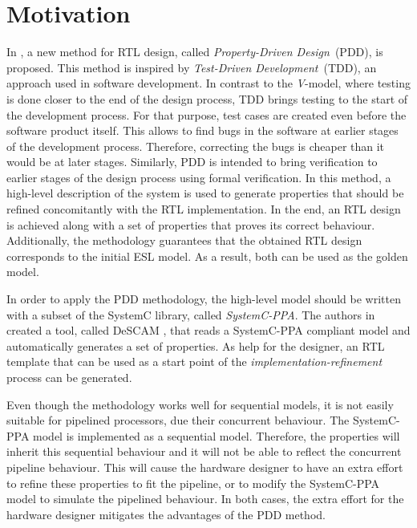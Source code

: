 \section*{Motivation}

In \cite{paper-pdd}, a new method for RTL design, called \textit{Property-Driven Design}~(PDD), is proposed. This method is inspired by \textit{Test-Driven Development}~(TDD), an approach used in software development. In contrast to the \textit{V}-model, where testing is done closer to the end of the design process, TDD brings testing to the start of the development process. For that purpose, test cases are created even before the software product itself. This allows to find bugs in the software at earlier stages of the development process. Therefore, correcting the bugs is cheaper than it would be at later stages. Similarly, PDD is intended to bring verification to earlier stages of the design process using formal verification. In this method, a high-level description of the system is used to generate properties that should be refined concomitantly with the RTL implementation. In the end, an RTL design is achieved along with a set of properties that proves its correct behaviour. Additionally, the methodology guarantees that the obtained RTL design corresponds to the initial ESL model. As a result, both can be used as the golden model.

In order to apply the PDD methodology, the high-level model should be written with a subset of the SystemC \cite{lib-systemc} library, called \textit{SystemC-PPA}. The authors in \cite{paper-pdd} created a tool, called DeSCAM \cite{descam}, that reads a SystemC-PPA compliant model and automatically generates a set of properties. As help for the designer, an RTL template that can be used as a start point of the \textit{implementation-refinement} process can be generated.

Even though the methodology works well for sequential models, it is not easily suitable for pipelined processors, due their concurrent behaviour. The SystemC-PPA model is implemented as a sequential model. Therefore, the properties will inherit this sequential behaviour and it will not be able to reflect the concurrent pipeline behaviour. This will cause the hardware designer to have an extra effort to refine these properties to fit the pipeline, or to modify the SystemC-PPA model to simulate the pipelined behaviour. In both cases, the extra effort for the hardware designer mitigates the advantages of the PDD method.

